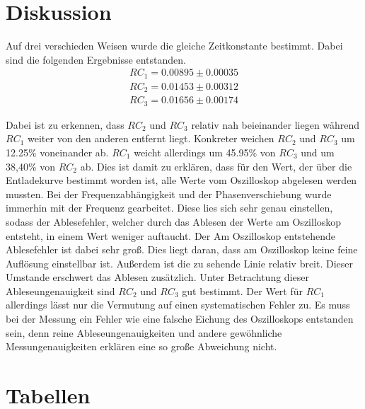\section{Diskussion}

Auf drei verschieden Weisen wurde die gleiche Zeitkonstante bestimmt. Dabei sind die folgenden Ergebnisse entstanden.
\begin{align}
    RC_1 = 0.00895 \pm 0.00035 \nonumber \\
    RC_2 = 0.01453 \pm 0.00312 \nonumber \\ 
    RC_3 = 0.01656 \pm 0.00174 \nonumber 
\end{align}

\noindent Dabei ist zu erkennen, dass $RC_2$ und $RC_3$ relativ nah beieinander liegen während $RC_1$ weiter von den anderen entfernt liegt. Konkreter weichen $RC_2$ und $RC_3$ um 12.25\% voneinander ab. $RC_1$ weicht allerdings um 45.95\% von $RC_3$ und um 38,40\% von $RC_2$ ab. 
Dies ist damit zu erklären, dass für den Wert, der über die Entladekurve bestimmt worden ist, alle Werte vom Oszilloskop abgelesen werden mussten. Bei der Frequenzabhängigkeit und der Phasenverschiebung wurde immerhin mit der Frequenz gearbeitet. Diese lies sich sehr genau einstellen, sodass der Ablesefehler, welcher durch das Ablesen der Werte am Oszilloskop entsteht, in einem Wert weniger auftaucht. Der Am Oszilloskop entstehende Ablesefehler ist dabei sehr groß. Dies liegt daran, dass am Oszilloskop keine feine Auflösung einstellbar ist. Außerdem ist die zu sehende Linie relativ breit. Dieser Umstande erschwert das Ablesen zusätzlich. 
Unter Betrachtung dieser Ableseungenauigkeit sind $RC_2$ und $RC_3$ gut bestimmt. Der Wert für $RC_1$ allerdings lässt nur die Vermutung auf einen systematischen Fehler zu. Es muss bei der Messung ein Fehler wie eine falsche Eichung des Oszilloskops entstanden sein, denn reine Ableseungenauigkeiten und andere gewöhnliche Messungenauigkeiten erklären eine so große Abweichung nicht. 


\section{Tabellen}

